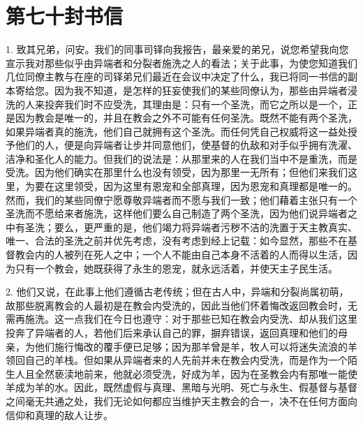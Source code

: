 

\section{第七十封书信}

\par

\par

1. 致其兄弟，问安。我们的同事司铎向我报告，最亲爱的弟兄，说您希望我向您宣示我对那些似乎由异端者和分裂者施洗之人的看法；关于此事，为使您知道我们几位同僚主教与在座的司铎弟兄们最近在会议中决定了什么，我已将同一书信的副本寄给您。因为我不知道，是怎样的狂妄使我们的某些同僚认为，那些由异端者浸洗的人来投奔我们时不应受洗，其理由是：只有一个圣洗，而它之所以是一个，正是因为教会是唯一的，并且在教会之外不可能有任何圣洗。既然不能有两个圣洗，如果异端者真的施洗，他们自己就拥有这个圣洗。而任何凭自己权威将这一益处授予他们的人，便是向异端者让步并同意他们，使基督的仇敌和对手似乎拥有洗濯、洁净和圣化人的能力。但我们的说法是：从那里来的人在我们当中不是重洗，而是受洗。因为他们确实在那里什么也没有领受，因为那里一无所有；但他们来我们这里，为要在这里领受，因为这里有恩宠和全部真理，因为恩宠和真理都是唯一的。然而，我们的某些同僚宁愿尊敬异端者而不愿与我们一致；他们藉着主张只有一个圣洗而不愿给来者施洗，这样他们要么自己制造了两个圣洗，因为他们说异端者之中有圣洗；要么，更严重的是，他们竭力将异端者污秽不洁的洗置于天主教真实、唯一、合法的圣洗之前并优先考虑，没有考虑到经上记载：如今显然，那些不在基督教会内的人被列在死人之中；一个人不能由自己本身不活着的人而得以生活，因为只有一个教会，她既获得了永生的恩宠，就永远活着，并使天主子民生活。\par

2. 他们又说，在此事上他们遵循古老传统；但在古人中，异端和分裂尚属初萌，故那些脱离教会的人最初是在教会内受洗的，因此当他们怀着悔改返回教会时，无需再施洗。这一点我们在今日也遵守：对于那些已知在教会内受洗、却从我们这里投奔了异端者的人，若他们后来承认自己的罪，摒弃错误，返回真理和他们的母亲，为他们施行悔改的覆手便已足够；因为那羊曾是羊，牧人可以将迷失流浪的羊领回自己的羊栈。但如果从异端者来的人先前并未在教会内受洗，而是作为一个陌生人且全然亵渎地前来，他就必须受洗，好成为羊，因为在圣教会内有那唯一能使羊成为羊的水。因此，既然虚假与真理、黑暗与光明、死亡与永生、假基督与基督之间毫无共通之处，我们无论如何都应当维护天主教会的合一，决不在任何方面向信仰和真理的敌人让步。\par

